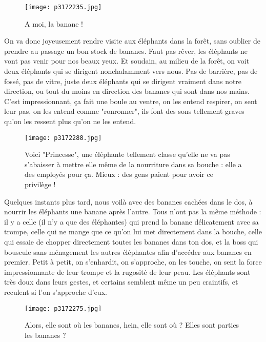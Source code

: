 \documentclass{book}
\begin{document}
\begin{figure}[h]
\centering
\texttt{[image: p3172235.jpg]}
\caption*{A moi, la banane !}
\end{figure}

On va donc joyeusement rendre visite aux éléphants dans la forêt, sans oublier de prendre au passage un bon stock de bananes. Faut pas rêver, les éléphants ne vont pas venir pour nos beaux yeux. Et soudain, au milieu de la forêt, on voit deux éléphants qui se dirigent nonchalamment vers nous. Pas de barrière, pas de fossé, pas de vitre, juste deux éléphants qui se dirigent vraiment dans notre direction, ou tout du moins en direction des bananes qui sont dans nos mains. C'est impressionnant, ça fait une boule au ventre, on les entend respirer, on sent leur pas, on les entend comme "ronronner", ils font des sons tellement graves qu'on les ressent plus qu'on ne les entend.


\begin{figure}[h]
\centering
\texttt{[image: p3172288.jpg]}
\caption*{Voici "Princesse", une éléphante tellement classe qu'elle ne va pas s'abaisser à mettre elle même de la nourriture dans sa bouche : elle a des employés pour ça. Mieux : des gens paient pour avoir ce privilège !}
\end{figure}

Quelques instants plus tard, nous voilà avec des bananes cachées dans le dos, à nourrir les éléphants une banane après l'autre. Tous n'ont pas la même méthode : il y a celle (il n'y a que des éléphantes) qui prend la banane délicatement avec sa trompe, celle qui ne mange que ce qu'on lui met directement dans la bouche, celle qui essaie de chopper directement toutes les bananes dans ton dos, et la boss qui bouscule sans ménagement les autres éléphantes afin d'accéder aux bananes en premier. Petit à petit, on s’enhardit, on s'approche, on les touche, on sent la force impressionnante de leur trompe et la rugosité de leur peau. Les éléphants sont très doux dans leurs gestes, et certains semblent même un peu craintifs, et reculent si l'on s'approche d'eux.


\begin{figure}[h]
\centering
\texttt{[image: p3172275.jpg]}
\caption*{Alors, elle sont où les bananes, hein, elle sont où ? Elles sont parties les bananes ?}
\end{figure}
\end{document}

